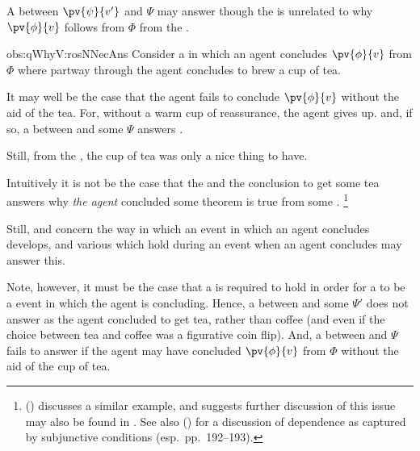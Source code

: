 \begin{note}
  \begin{observation}%
    \label{obs:qWhyV:rosNNecAns}%
    A \ros{} between \(\pv{\psi}{v'}\) and \(\Psi\) may answer \qWhyV{} though the \ros{} is unrelated to why \(\pv{\phi}{v}\) follows from \(\Phi\) from the \agpe{\agents{}}.
  \end{observation}

  \begin{motivation}{obs:qWhyV:rosNNecAns}
    Consider a  in which an agent concludes \(\pv{\phi}{v}\) from \(\Phi\) where partway through the agent concludes to brew a cup of tea.

    It may well be the case that the agent fails to conclude \(\pv{\phi}{v}\) without the aid of the tea.
    For, without a warm cup of reassurance, the agent gives up.
    and, if so, a \ros{} between  and some \pool{} \(\Psi\) answers \qWhyV{}.

    Still, from the \agpe{\agents{}}, the cup of tea was only a nice thing to have.
  \end{motivation}

  \noindent%
  Intuitively it is not be the case that the \ros{} and the conclusion to get some tea answers why \emph{the agent} concluded some theorem is true from some \pool{}.%
  \footnote{
    \citeauthor{Armstrong:1968vh} (\citeyear[195--196]{Armstrong:1968vh}) discusses a similar example, and suggests further discussion of this issue may also be found in \textcite{Moore:1962up}.
    See also \citeauthor{Sanford:1989aa} (\citeyear{Sanford:1989aa}) for a discussion of dependence as captured by subjunctive conditions (esp.\ pp.\ 192--193).
  }

  Still, \qWhy{} and \qWhyV{} concern the way in which an event in which an agent concludes develops, and various \ros{} which hold during an event when an agent concludes may answer this.

  Note, however, it must be the case that a \ros{} is required to hold in order for a \se{} to be a event in which the agent is concluding.
  Hence, a \ros{} between  and some \pool{} \(\Psi'\) does not answer \qWhyV{} as the agent concluded to get tea, rather than coffee (and even if the choice between tea and coffee was a figurative coin flip).
  And, a \ros{} between  and \(\Psi\) fails to answer \qWhyV{} if the agent may have concluded \(\pv{\phi}{v}\) from \(\Phi\) without the aid of the cup of tea.
\end{note}


